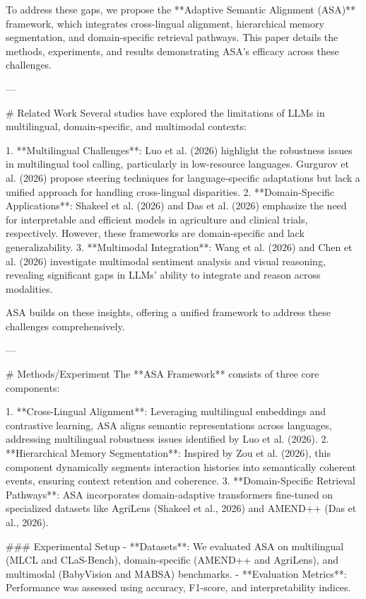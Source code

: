 To address these gaps, we propose the **Adaptive Semantic Alignment (ASA)** framework, which integrates cross-lingual alignment, hierarchical memory segmentation, and domain-specific retrieval pathways. This paper details the methods, experiments, and results demonstrating ASA's efficacy across these challenges.

---

# Related Work  
Several studies have explored the limitations of LLMs in multilingual, domain-specific, and multimodal contexts:  

1. **Multilingual Challenges**: Luo et al. (2026) highlight the robustness issues in multilingual tool calling, particularly in low-resource languages. Gurgurov et al. (2026) propose steering techniques for language-specific adaptations but lack a unified approach for handling cross-lingual disparities.  
2. **Domain-Specific Applications**: Shakeel et al. (2026) and Das et al. (2026) emphasize the need for interpretable and efficient models in agriculture and clinical trials, respectively. However, these frameworks are domain-specific and lack generalizability.  
3. **Multimodal Integration**: Wang et al. (2026) and Chen et al. (2026) investigate multimodal sentiment analysis and visual reasoning, revealing significant gaps in LLMs' ability to integrate and reason across modalities.  

ASA builds on these insights, offering a unified framework to address these challenges comprehensively.

---

# Methods/Experiment  
The **ASA Framework** consists of three core components:  

1. **Cross-Lingual Alignment**: Leveraging multilingual embeddings and contrastive learning, ASA aligns semantic representations across languages, addressing multilingual robustness issues identified by Luo et al. (2026).  
2. **Hierarchical Memory Segmentation**: Inspired by Zou et al. (2026), this component dynamically segments interaction histories into semantically coherent events, ensuring context retention and coherence.  
3. **Domain-Specific Retrieval Pathways**: ASA incorporates domain-adaptive transformers fine-tuned on specialized datasets like AgriLens (Shakeel et al., 2026) and AMEND++ (Das et al., 2026).  

### Experimental Setup  
- **Datasets**: We evaluated ASA on multilingual (MLCL and CLaS-Bench), domain-specific (AMEND++ and AgriLens), and multimodal (BabyVision and MABSA) benchmarks.  
- **Evaluation Metrics**: Performance was assessed using accuracy, F1-score, and interpretability indices.  

